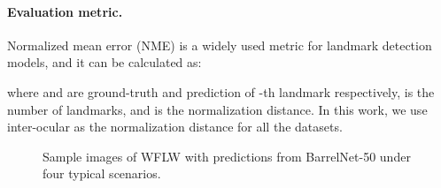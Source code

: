 \documentclass{article}
\begin{document}
\paragraph{Evaluation metric.}
Normalized mean error (NME) is a widely used metric for landmark detection models, and it can be calculated as:



where  and  are ground-truth and prediction of -th landmark respectively,  is the number of landmarks, and  is the normalization distance. In this work, we use inter-ocular as the normalization distance for all the datasets. 

\begin{figure}
\centering
    \vspace{-3mm}
    \caption{Sample images of WFLW with predictions from BarrelNet-50 under four typical scenarios. \label{fig:robust}}
\end{figure}
\end{document}
